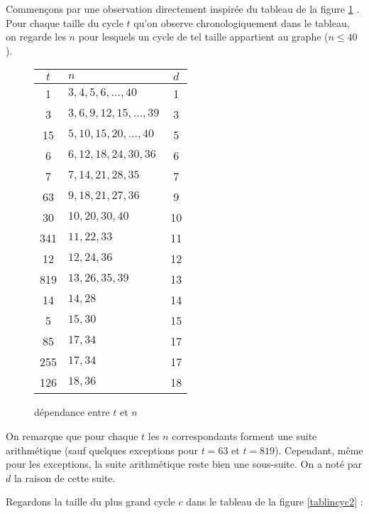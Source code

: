 Commen\c cons par une observation directement inspir\'ee du tableau de la figure \ref{tablincyc} . Pour chaque taille du cycle $t$ qu'on observe chronologiquement dans le tableau, on regarde les $n$ pour lesquels un cycle de tel taille appartient au graphe ($n \leqslant 40$).

\begin{figure}[!]
\begin{center}
 \begin{tabular}{||c  l  c||}
 \hline
 $t$ & $n$ & $d$ \\ [0.5ex] 
 \hline\hline
 1 & $3,4,5,6,\dots ,40$ & 1\\ 
 \hline
 3 & $3,6,9,12,15,\dots,39$ & 3 \\
 \hline
 15 & $5,10,15,20,\dots,40$ & 5\\
 \hline
 6 & $6,12,18,24,30,36$ & 6\\
 \hline
 7 & $7,14,21,28,35$ & 7\\
 \hline
 63 & $9,18,21,27,36$ & 9\\
 \hline
 30 & $10,20,30,40$ & 10\\
 \hline
 341 & $11,22,33$ & 11\\
 \hline
 12 & $12,24,36$ & 12\\
 \hline
 819 & $13,26,35,39$ & 13\\
 \hline
 14 & $14,28$ & 14\\
 \hline
 5 & $15,30$ & 15\\
 \hline
 85 & $17,34$ & 17\\
 \hline
 255 & $17,34$ & 17\\
 \hline
 126 & $18,36$ & 18\\
 \hline
\end{tabular}
\end{center}
\caption{d\'ependance entre $t$ et $n$}\label{tablincyc}
\end{figure}


On remarque que pour chaque $t$ les $n$ correspondants forment une suite arithm\'etique (sauf quelques exceptions pour $t=63$ et $t=819$). Cependant, m\^eme pour les exceptions, la suite arithmétique reste bien une sous-suite. On a not\'e par $d$ la raison de cette suite.

Regardons la taille du plus grand cycle $c$ dans le tableau de la figure \ref{tablincyc2} :

